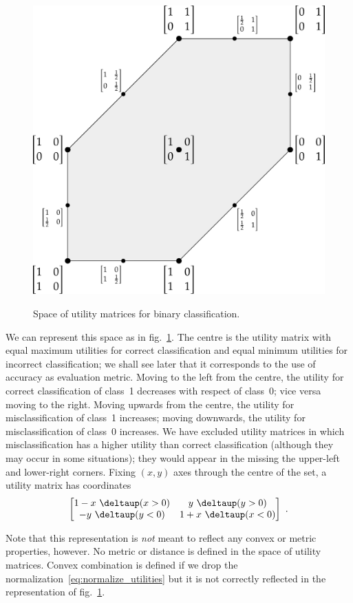 \documentclass[\ifafour a4paper,12pt,\else a5paper,10pt,\fi%
onecolumn,oneside,article,%
british%
]{memoir}
\theoremstyle{remark}
\theoremstyle{innote}
\newcommand*{\pencil}{{\fontencoding{U}\fontfamily{fontawesometwo}\selectfont\symbol{210}}}
\newcommand{\mynotep}[1]{{\footnotesize\color{notecolour}\pencil\ #1}}
\newcommand*{\delt}{\deltaup}%
\renewcommand*{\|}[1][]{\nonscript\:#1\vert\nonscript\:\mathopen{}}
\newcommand*{\sect}{\S}%
\newcommand*{\fig}{fig.}%
\begin{document}
\begin{figure}[t]
  \centering
  \includegraphics[width=0.65\linewidth]{space_UM2c.pdf}\\
  \caption{Space of utility matrices for binary classification.}
  \label{fig:space_UM}
\end{figure}
We can represent this space as in \fig~\ref{fig:space_UM}. The centre is the utility matrix with equal maximum utilities for correct classification and equal minimum utilities for incorrect classification; we shall see later that it corresponds to the use of accuracy as evaluation metric. Moving to the left from the centre, the utility for correct classification of class~1 decreases with respect of class~0; vice versa moving to the right. Moving upwards from the centre, the utility for misclassification of class~1 increases; moving downwards, the utility for misclassification of class~0 increases. We have excluded utility matrices in which misclassification has a higher utility than correct classification (although they may occur in some situations); they would appear in the missing the upper-left and lower-right corners. Fixing $(x,y)$ axes through the centre of the set, a utility matrix has coordinates
\begin{equation}
  \label{eq:coords_um}
  \begin{bmatrix}
    1 - x\ \delt(x > 0) & y\ \delt(y>0) \\
    -y\ \delt(y<0) & 1 + x\ \delt(x < 0)
  \end{bmatrix} \ .
\end{equation}

Note that this representation is \emph{not} meant to reflect any convex or metric properties, however. No metric or distance is defined in the space of utility matrices. Convex combination is defined if we drop the normalization~\eqref{eq:normalize_utilities} %
but it is not correctly reflected in the representation of \fig~\ref{fig:space_UM}.
\end{document}
